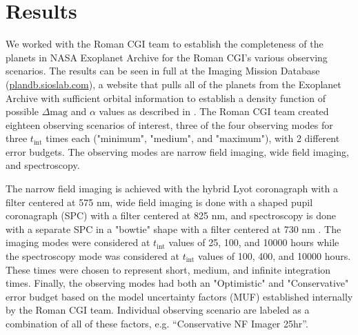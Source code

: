 \section{Results}%
\label{sec:coupling_results}

We worked with the Roman CGI team to establish the completeness of the planets
in NASA Exoplanet Archive \citep{akesonNASAExoplanet2013} for the Roman CGI's
various observing scenarios. The results can be seen in full at the Imaging Mission Database
(\url{plandb.sioslab.com}), a website that pulls all of the planets from the
Exoplanet Archive with sufficient orbital information to establish a density
function of possible $\Delta\textrm{mag}$ and $\alpha$ values as described in
\citet{savranskyExplorationDynamical2019}. The Roman CGI team created eighteen
observing scenarios of interest, three of the four observing modes for three
$t_\textrm{int}$ times each ("minimum", "medium", and "maximum"), with 2
different error budgets. The observing modes are narrow field imaging, wide
field imaging, and spectroscopy.

The narrow field imaging is achieved with the hybrid Lyot coronagraph with a
filter centered at 575 nm, wide field imaging is done with a shaped pupil
coronagraph (SPC) with a filter centered at 825 nm, and spectroscopy is done
with a separate SPC in a "bowtie" shape with a filter centered at 730 nm
\citep{kasdinNancyGrace2020}. 
The imaging modes were considered at $t_\textrm{int}$ values of 25, 100, and
10000 hours while the spectroscopy mode was considered at $t_\textrm{int}$
values of 100, 400, and 10000 hours. These times were chosen to represent
short, medium, and infinite integration times. Finally, the observing modes had
both an "Optimistic" and "Conservative" error budget based on the model
uncertainty factors (MUF) established internally by the Roman CGI team. 
Individual observing scenario are labeled as a combination of all of these factors, e.g. ``Conservative NF Imager 25hr''.


